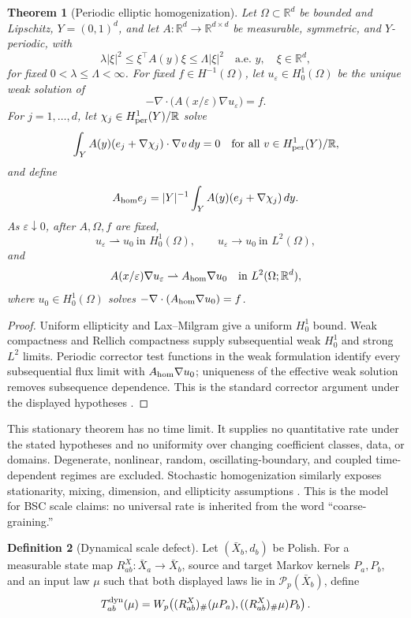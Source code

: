 \documentclass[11pt,a4paper]{article}
\theoremstyle{definition}
\newtheorem{definition}{Definition}[section]
\theoremstyle{plain}
\newtheorem{theorem}[definition]{Theorem}
\theoremstyle{remark}
\newcommand{\push}{_{\#}}
\begin{document}
\begin{theorem}[Periodic elliptic homogenization]\label{thm:periodichom}
Let \(\Omega\subset\mathbb R^d\) be bounded and Lipschitz,
\(Y=(0,1)^d\), and let
\(A:\mathbb R^d\to\mathbb R^{d\times d}\) be measurable, symmetric, and
\(Y\)-periodic, with
\[
\lambda|\xi|^2\le \xi^\top A(y)\xi\le\Lambda|\xi|^2
\quad\text{a.e. }y,\quad \xi\in\mathbb R^d,
\]
for fixed \(0<\lambda\le\Lambda<\infty\).  For fixed
\(f\in H^{-1}(\Omega)\), let \(u_\varepsilon\in H_0^1(\Omega)\) be the
unique weak solution of
\[
-\nabla\!\cdot\!\bigl(A(x/\varepsilon)\nabla u_\varepsilon\bigr)=f .
\]
For \(j=1,\ldots,d\), let
\(\chi_j\in H_{\rm per}^1(Y)/\mathbb R\) solve
\[
\int_Y A(y)(e_j+\nabla\chi_j)\cdot\nabla v\,dy=0
\quad\text{for all }v\in H_{\rm per}^1(Y)/\mathbb R,
\]
and define
\[
A_{\rm hom}e_j=|Y|^{-1}\int_Y A(y)(e_j+\nabla\chi_j)\,dy .
\]
As \(\varepsilon\downarrow0\), after \(A,\Omega,f\) are fixed,
\[
u_\varepsilon\rightharpoonup u_0\ \text{in }H_0^1(\Omega),\qquad
u_\varepsilon\to u_0\ \text{in }L^2(\Omega),
\]
and
\[
A(x/\varepsilon)\nabla u_\varepsilon
\rightharpoonup A_{\rm hom}\nabla u_0
\quad\text{in }L^2(\Omega;\mathbb R^d),
\]
where \(u_0\in H_0^1(\Omega)\) solves
\(-\nabla\cdot(A_{\rm hom}\nabla u_0)=f\).
\end{theorem}
\begin{proof}
Uniform ellipticity and Lax--Milgram give a uniform \(H_0^1\) bound.
Weak compactness and Rellich compactness supply subsequential weak
\(H_0^1\) and strong \(L^2\) limits.  Periodic corrector test functions in
the weak formulation identify every subsequential flux limit with
\(A_{\rm hom}\nabla u_0\); uniqueness of the effective weak solution removes
subsequence dependence.  This is the standard corrector argument under the
displayed hypotheses \citep{bensoussanlionspapanicolaou1978}.
\end{proof}

This stationary theorem has no time limit.  It supplies no quantitative rate
under the stated hypotheses and no uniformity over changing coefficient
classes, data, or domains.  Degenerate, nonlinear, random,
oscillating-boundary, and coupled time-dependent regimes are excluded.
Stochastic
homogenization similarly exposes stationarity, mixing, dimension, and
ellipticity assumptions \citep{gloriaotto2012,armstrongsmart2016}.  This is the
model for BSC scale claims: no universal rate is inherited from the word
``coarse-graining.''

\begin{definition}[Dynamical scale defect]\label{def:scaledyn}
Let \((\bar X_b,d_b)\) be Polish.  For a measurable state map
\(R_{ab}^X:\bar X_a\to\bar X_b\), source and target Markov kernels
\(P_a,P_b\), and an input law \(\mu\) such that both displayed laws lie in
\(\mathcal P_p(\bar X_b)\), define
\[
T^{\rm dyn}_{ab}(\mu)=
W_p\!\left((R_{ab}^X)\push(\mu P_a),
((R_{ab}^X)\push\mu)P_b\right).
\]
\end{definition}
\end{document}
